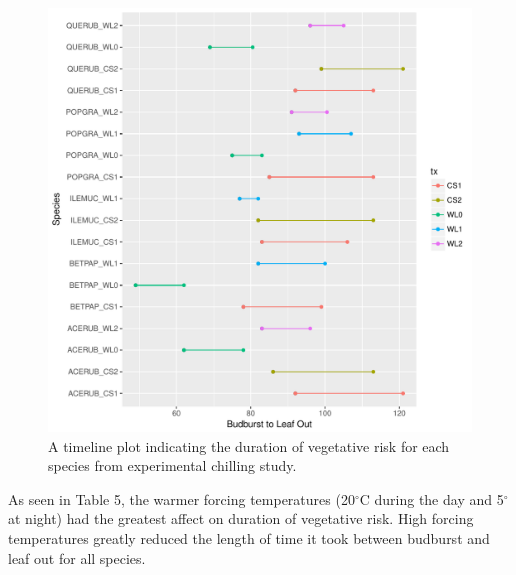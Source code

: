 \documentclass{article}\usepackage[]{graphicx}\usepackage[]{color}
\makeatletter
\def\maxwidth{ %
  \ifdim\Gin@nat@width>\linewidth
    \linewidth
  \else
    \Gin@nat@width
  \fi
}
\newenvironment{kframe}{%
 \def\at@end@of@kframe{}%
 \ifinner\ifhmode%
  \def\at@end@of@kframe{\end{minipage}}%
  \begin{minipage}{\columnwidth}%
 \fi\fi%
 \def\FrameCommand##1{\hskip\@totalleftmargin \hskip-\fboxsep
 \colorbox{shadecolor}{##1}\hskip-\fboxsep
     \hskip-\linewidth \hskip-\@totalleftmargin \hskip\columnwidth}%
 \MakeFramed {\advance\hsize-\width
   \@totalleftmargin\z@ \linewidth\hsize
   \@setminipage}}%
 {\par\unskip\endMakeFramed%
 \at@end@of@kframe}
\makeatother
\begin{document}
\begin{kframe}


{\ttfamily\noindent\bfseries{}}\end{kframe}\begin{figure}[H]
\includegraphics[width=\maxwidth]{figure/chilling-1} \caption[A timeline plot indicating the duration of vegetative risk for each species from experimental chilling study]{A timeline plot indicating the duration of vegetative risk for each species from experimental chilling study.}\label{fig:chilling}
\end{figure}



As seen in Table 5, the warmer forcing temperatures (20$^{\circ}$C during the day and 5$^{\circ}$ at night) had the greatest affect on duration of vegetative risk. High forcing temperatures greatly reduced the length of time it took between budburst and leaf out for all species. 
\end{document}
